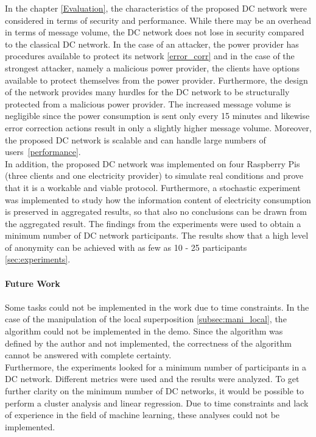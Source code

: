 In the chapter \ref{Evaluation}, the characteristics of the proposed DC network were considered in terms of security and performance. While there may be an overhead in terms of message volume, the DC network does not lose in security compared to the classical DC network. In the case of an attacker, the power provider has procedures available to protect its network \ref{error_corr} and in the case of the strongest attacker, namely a malicious power provider, the clients have options available to protect themselves from the power provider. Furthermore, the design of the network provides many hurdles for the DC network to be structurally protected from a malicious power provider. The increased message volume is negligible since the power consumption is sent only every 15 minutes and likewise error correction actions result in only a slightly higher message volume. Moreover, the proposed DC network is scalable and can handle large numbers of users~\ref{performance}.\\
In addition, the proposed DC network was implemented on four Raspberry Pis (three clients and one electricity provider) to simulate real conditions and prove that it is a workable and viable protocol. Furthermore, a stochastic experiment was implemented to study how the information content of electricity consumption is preserved in aggregated results, so that also no conclusions can be drawn from the aggregated result. The findings from the experiments were used to obtain a minimum number of DC network participants. The results show that a high level of anonymity can be achieved with as few as 10 - 25 participants \ref{sec:experiments}. \\
\\
\textbf{Future Work}
\\
\\
Some tasks could not be implemented in the work due to time constraints. In the case of the manipulation of the local superposition \ref{subsec:mani_local}, the algorithm could not be implemented in the demo. Since the algorithm was defined by the author and not implemented, the correctness of the algorithm cannot be answered with complete certainty. \\
Furthermore, the experiments looked for a minimum number of participants in a DC network. Different metrics were used and the results were analyzed. To get further clarity on the minimum number of DC networks, it would be possible to perform a cluster analysis and linear regression. Due to time constraints and lack of experience in the field of machine learning, these analyses could not be implemented.



\cleardoublepage

